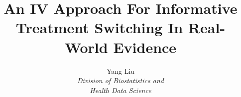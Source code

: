 \documentclass[xcolor=x11names,compress, aspectratio=43   ]{beamer}
\begin{document}
\title{An IV Approach For Informative Treatment Switching In Real-World Evidence}
\author[Yang L]{
  Yang Liu\\
  {\it \small Division of Biostatistics and\\ Health Data Science}\\
}
\date{}

{%
  \begin{frame}
    \titlepage
  \end{frame}
}
\end{document}
